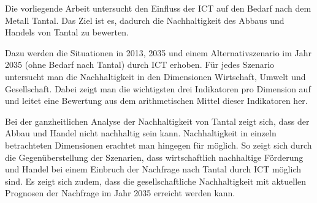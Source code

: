 Die vorliegende Arbeit untersucht den Einfluss der ICT auf den Bedarf nach dem Metall Tantal. Das Ziel ist es, dadurch die Nachhaltigkeit des Abbaus und Handels von Tantal zu bewerten.

Dazu werden die Situationen in 2013, 2035 und einem Alternativszenario im Jahr 2035 (ohne Bedarf nach Tantal) durch ICT erhoben. Für jedes Szenario untersucht man die Nachhaltigkeit in den Dimensionen Wirtschaft, Umwelt und Gesellschaft. Dabei zeigt man die wichtigsten drei Indikatoren pro Dimension auf und leitet eine Bewertung aus dem arithmetischen Mittel dieser Indikatoren her.

Bei der ganzheitlichen Analyse der Nachhaltigkeit von Tantal zeigt sich, dass der Abbau und Handel nicht nachhaltig sein kann. Nachhaltigkeit in einzeln betrachteten Dimensionen erachtet man hingegen für möglich. So zeigt sich durch die Gegenüberstellung der Szenarien, dass wirtschaftlich nachhaltige Förderung und Handel bei einem Einbruch der Nachfrage nach Tantal durch ICT möglich sind. Es zeigt sich zudem, dass die gesellschaftliche Nachhaltigkeit mit aktuellen Prognosen der Nachfrage im Jahr 2035 erreicht werden kann.
